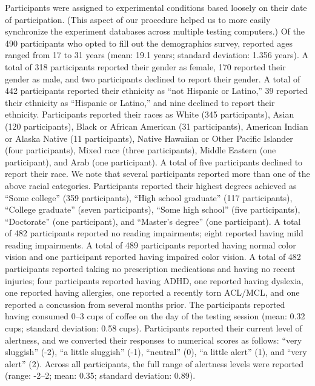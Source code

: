 \documentclass[11pt]{article}
\begin{document}
Participants were assigned to experimental conditions based loosely on their
date of participation. (This aspect of our procedure helped us to more easily
synchronize the experiment databases across multiple testing computers.) Of the
490 participants who opted to fill out the demographics survey, reported ages
ranged from 17 to 31 years (mean: 19.1 years; standard deviation: 1.356 years).
A total of 318 participants reported their gender as female, 170 reported their
gender as male, and two participants declined to report their gender. A total
of 442 participants reported their ethnicity as ``not Hispanic or Latino,'' 39
reported their ethnicity as ``Hispanic or Latino,'' and nine declined to report
their ethnicity. Participants reported their races as White (345 participants),
Asian (120 participants), Black or African American (31 participants), American
Indian or Alaska Native (11 participants), Native Hawaiian or Other Pacific
Islander (four participants), Mixed race (three participants), Middle Eastern
(one participant), and Arab (one participant). A total of five participants
declined to report their race. We note that several participants reported more
than one of the above racial categories. Participants reported their highest
degrees achieved as ``Some college'' (359 participants), ``High school
graduate'' (117 participants), ``College graduate'' (seven participants),
``Some high school'' (five participants), ``Doctorate'' (one participant), and
``Master's degree'' (one participant). A total of 482 participants reported no
reading impairments; eight reported having mild reading impairments. A total of
489 participants reported having normal color vision and one participant
reported having impaired color vision. A total of 482 participants reported
taking no prescription medications and having no recent injuries; four
participants reported having ADHD, one reported having dyslexia, one reported
having allergies, one reported a recently torn ACL/MCL, and one reported a
concussion from several months prior. The participants reported having consumed
0--3 cups of coffee on the day of the testing session (mean: 0.32 cups;
standard deviation: 0.58 cups). Participants reported their current level of
alertness, and we converted their responses to numerical scores as follows:
``very sluggish'' (-2), ``a little sluggish'' (-1), ``neutral'' (0), ``a little
alert'' (1), and ``very alert'' (2). Across all participants, the full range of
alertness levels were reported (range: -2--2; mean: 0.35; standard deviation:
0.89).
\end{document}
